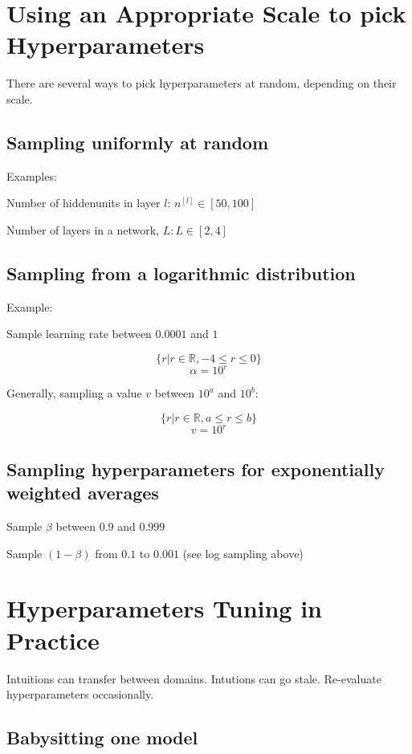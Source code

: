 \section{Using an Appropriate Scale to pick Hyperparameters}

There are several ways to pick hyperparameters at random, depending on their scale.

\subsection*{Sampling uniformly at random }

Examples:

Number of hiddenunits in layer $l$: $n^{[l]} \in [50,100]$

Number of layers in a network, $L: L \in [2,4]$

\subsection*{Sampling from a logarithmic distribution}

Example:

Sample learning rate between $0.0001$ and $1$

\[ \{r | r \in \mathbb{R}, -4 \leq r \leq 0\} \]
\[ \alpha = 10^r \]

Generally, sampling a value $v$ between $10^a$  and $10^b$:

\[ \{ r | r \in \mathbb{R}, a \le r \le b\} \]
\[ v = 10^r \]

\subsection*{Sampling hyperparameters for exponentially weighted averages}

Sample $\beta$ between $0.9$ and $0.999$

Sample $(1 - \beta)$  from $0.1$ to $0.001$ (see log sampling above)


\section{Hyperparameters Tuning in Practice}

Intuitions can transfer between domains.
Intutions can go stale. Re-evaluate hyperparameters occasionally.

\subsection*{Babysitting one model}

